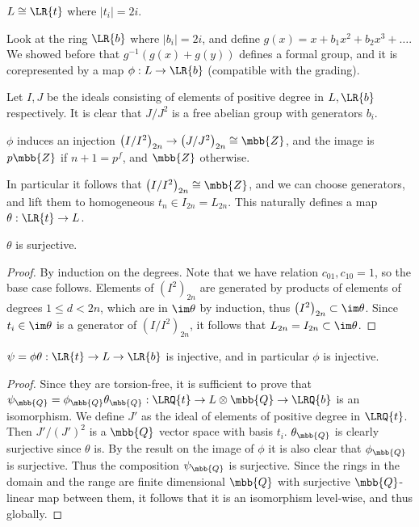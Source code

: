 \begin{theorem*}[Lazard]
	$L \cong \LR{t}$ where $\left|t_i\right| = 2i$.
\end{theorem*}

Look at the ring $\LR{b}$ where $\left|b_i\right| = 2i$,
and define $g\left(x\right) = x + b_1 x^2 + b_2 x^3 + \dotsc$.
We showed before that $g^{-1}\left(g\left(x\right) + g\left(y\right)\right)$ defines a formal group,
and it is corepresented by a map $\phi: L \to \LR{b}$ (compatible with the grading).

Let $I,J$ be the ideals consisting of elements of positive degree in $L,\LR{b}$ respectively.
It is clear that $J/J^2$ is a free abelian group with generators $b_i$.

\begin{lemma*}
	$\phi$ induces an injection
	$\left(I/I^2\right)_{2n} \to \left(J/J^2\right)_{2n} \cong \mbb{Z}$,
	and the image is $p\mbb{Z}$ if $n+1=p^f$, and $\mbb{Z}$ otherwise.
\end{lemma*}

In particular it follows that $\left(I/I^2\right)_{2n} \cong \mbb{Z}$,
and we can choose generators, and lift them to homogeneous $t_n \in I_{2n} = L_{2n}$.
This naturally defines a map $\theta: \LR{t} \to L$.

\begin{lemma*}
	$\theta$ is surjective.
\end{lemma*}

\begin{proof}
	By induction on the degrees.
	Note that we have relation $c_{01}, c_{10} = 1$, so the base case follows.
	Elements of $\left(I^2\right)_{2n}$ are generated by products of elements of degrees $1 \leq d < 2n$, which are in $\im \theta$ by induction, thus $\left(I^2\right)_{2n} \subset \im \theta$.
	Since $t_i \in \im \theta$ is a generator of $\left(I/I^2\right)_{2n}$, it follows that $L_{2n} = I_{2n} \subset \im \theta$.
\end{proof}

\begin{lemma*}
	$\psi = \phi\theta: \LR{t} \to L \to \LR{b}$ is injective, and in particular $\phi$ is injective.
\end{lemma*}

\begin{proof}
	Since they are torsion-free, it is sufficient to prove that
	$\psi_\mbb{Q} = \phi_\mbb{Q}\theta_\mbb{Q}: \LRQ{t} \to L\otimes\mbb{Q} \to \LRQ{b}$
	is an isomorphism.
	We define $J'$ as the ideal of elements of positive degree in $\LRQ{t}$.
	Then $J'/\left(J'\right)^2$ is a $\mbb{Q}$ vector space with basis $t_i$.
	$\theta_\mbb{Q}$ is clearly surjective since $\theta$ is.
	By the result on the image of $\phi$ it is also clear that $\phi_\mbb{Q}$ is surjective.
	Thus the composition $\psi_\mbb{Q}$ is surjective.
	Since the rings in the domain and the range are finite dimensional $\mbb{Q}$ with surjective $\mbb{Q}$-linear map between them, it follows that it is an isomorphism level-wise, and thus globally.
\end{proof}
